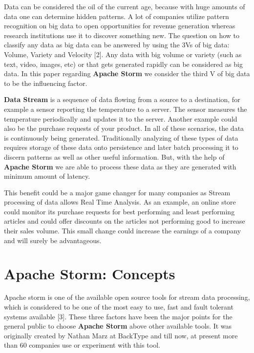 \documentclass[runningheads,a4paper]{llncs}[2015/06/24]
\begin{document}
Data can be considered the oil of the current age, because with huge amounts of data one can determine hidden patterns. A lot of companies utilize pattern recognition on big data to open opportunities for revenue generation whereas research institutions use it to discover something new. The question on how to classify any data as big data can be answered by using the 3Vs of big data: Volume, Variety and Velocity [2]. Any data with big volume or variety (such as text, video, images, etc) or that gets generated rapidly can be considered as big data. In this paper regarding \textbf{Apache Storm} we consider the third V of big data to be the influencing factor.

\textbf{Data Stream} is a sequence of data flowing from a source to a destination, for example a sensor reporting the temperature to a server. The sensor measures the temperature periodically and updates it to the server. Another example could also be the purchase requests of your product. In all of these scenarios, the data is continuously being generated. Traditionally analyzing of these types of data requires storage of these data onto persistence and later batch processing it to discern patterns as well as other useful information. But, with the help of \textbf{Apache Storm} we are able to process these data as they are generated with minimum amount of latency.

This benefit could be a major game changer for many companies as Stream processing of data allows Real Time Analysis. As an example, an online store could monitor its purchase requests for best performing and least performing articles and could offer discounts on the articles not performing good to increase their sales volume. This small change could increase the earnings of a company and will surely be advantageous.

\section{Apache Storm: Concepts}

Apache storm is one of the available open source tools for stream data processing, which is considered to be one of the most easy to use, fast and fault tolerant systems available [3]. These three factors have been the major points for the general public to choose \textbf{Apache Storm} above other available tools. It was originally created by Nathan Marz at BackType and till now, at present more than 60 companies use or experiment with this tool.
\end{document}
